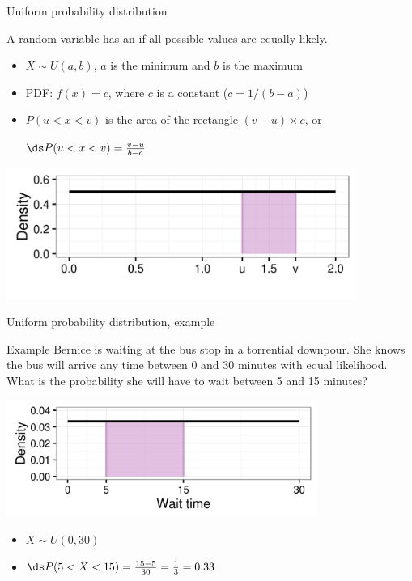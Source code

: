 \documentclass[xcolor=table, handout]{beamer}
\begin{document}
\begin{frame}{Uniform probability distribution}
\begin{block}{}
{\large A random variable has an  if all possible values are equally likely.}
\begin{itemize}
\pause\item $X \sim U(a,b)$, $a$ is the minimum and $b$ is the maximum
\pause\item PDF: $f(x) = c$, where $c$ is a constant ($c = 1/(b-a)$)
\pause\item $P(u < x < v)$ is the area of the rectangle $(v-u) \times c$, or\\
\smallskip
{\centering $\ds P(u < x < v) = \frac {v-u}{b-a}$ \par} 
\end{itemize}
\end{block}
\smallskip
{\centering
\includegraphics[width=4.5in]{../images/ch6_uniform}
\par}

\end{frame}

\begin{frame}{Uniform probability distribution, example}
\begin{exampleblock}{Example}
Bernice is waiting at the bus stop in a torrential downpour. She knows the bus will arrive any time between 0 and 30 minutes with equal likelihood. What is the probability she will have to wait between 5 and 15 minutes?\\
\smallskip
{\centering
\includegraphics[width=4in]{../images/ch6_bus}
\par}
\begin{itemize}
\pause\item $X \sim U(0,30)$
\pause\item $\ds P(5 < X < 15) = \frac{15-5}{30} = \frac 1 3 = 0.33$
\end{itemize}
\end{exampleblock}
\end{frame}
\end{document}
